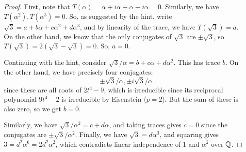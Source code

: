 \begin{proof}
    First, note that $T(\alpha) = \alpha + i\alpha - \alpha - i\alpha = 0$. Similarly, we have $T(\alpha^2),T(\alpha^3) = 0$. So, as suggested by the hint, write $\sqrt{3} = a + b\alpha + c\alpha^2 + d\alpha^3$, and by linearity of the trace, we have $T(\sqrt{3}) = a$. On the other hand, we know that the only conjugates of $\sqrt{3}$ are $\pm \sqrt{3}$, so $T(\sqrt{3}) = 2(\sqrt{3}-\sqrt{3}) = 0$. So, $a=0$.

    Continuing with the hint, consider $\sqrt{3}/\alpha = b+c\alpha+d\alpha^2$. This has trace $b$. On the other hand, we have precisely four conjugates:
    \[ \pm \sqrt{3}/\alpha, \pm i\sqrt{3}/\alpha \]
    since these are all roots of $2t^4 - 9$, which is irreducible since its reciprocal polynomial $9t^4-2$ is irreducible by Eisenstein ($p=2$). But the sum of these is also zero, so we get $b = 0$.

    Similarly, we have $\sqrt{3}/\alpha^2 = c+d\alpha$, and taking traces gives $c=0$ since the conjugates are $\pm \sqrt{3}/\alpha^2$. Finally, we have $\sqrt{3} = d\alpha^3$, and squaring gives $3 = d^2\alpha^6 = 2d^2\alpha^2$, which contradicts linear independence of $1$ and $\alpha^2$ over $\mathbb{Q}$.
\end{proof}
